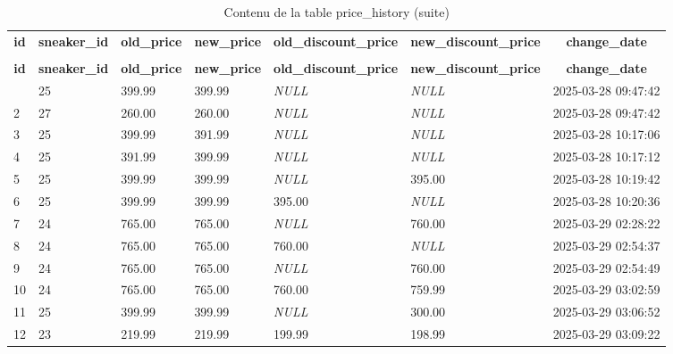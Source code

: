 %
%
 \begin{longtable}{|l|l|l|l|l|l|l|} 
 \hline \endhead \hline \endfoot \hline 
 \caption{Contenu de la table price\_history} \label{tab:price_history-data} \\\hline \multicolumn{1}{|c|}{\textbf{id}} & \multicolumn{1}{|c|}{\textbf{sneaker\_id}} & \multicolumn{1}{|c|}{\textbf{old\_price}} & \multicolumn{1}{|c|}{\textbf{new\_price}} & \multicolumn{1}{|c|}{\textbf{old\_discount\_price}} & \multicolumn{1}{|c|}{\textbf{new\_discount\_price}} & \multicolumn{1}{|c|}{\textbf{change\_date}} \\ \hline \hline  \endfirsthead 
\caption{Contenu de la table price\_history (suite)} \\ \hline \multicolumn{1}{|c|}{\textbf{id}} & \multicolumn{1}{|c|}{\textbf{sneaker\_id}} & \multicolumn{1}{|c|}{\textbf{old\_price}} & \multicolumn{1}{|c|}{\textbf{new\_price}} & \multicolumn{1}{|c|}{\textbf{old\_discount\_price}} & \multicolumn{1}{|c|}{\textbf{new\_discount\_price}} & \multicolumn{1}{|c|}{\textbf{change\_date}} \\ \hline \hline \endhead \endfoot
1 & 25 & 399.99 & 399.99 & \textit{NULL} & \textit{NULL} & 2025-03-28 09:47:42 \\ \hline 
2 & 27 & 260.00 & 260.00 & \textit{NULL} & \textit{NULL} & 2025-03-28 09:47:42 \\ \hline 
3 & 25 & 399.99 & 391.99 & \textit{NULL} & \textit{NULL} & 2025-03-28 10:17:06 \\ \hline 
4 & 25 & 391.99 & 399.99 & \textit{NULL} & \textit{NULL} & 2025-03-28 10:17:12 \\ \hline 
5 & 25 & 399.99 & 399.99 & \textit{NULL} & 395.00 & 2025-03-28 10:19:42 \\ \hline 
6 & 25 & 399.99 & 399.99 & 395.00 & \textit{NULL} & 2025-03-28 10:20:36 \\ \hline 
7 & 24 & 765.00 & 765.00 & \textit{NULL} & 760.00 & 2025-03-29 02:28:22 \\ \hline 
8 & 24 & 765.00 & 765.00 & 760.00 & \textit{NULL} & 2025-03-29 02:54:37 \\ \hline 
9 & 24 & 765.00 & 765.00 & \textit{NULL} & 760.00 & 2025-03-29 02:54:49 \\ \hline 
10 & 24 & 765.00 & 765.00 & 760.00 & 759.99 & 2025-03-29 03:02:59 \\ \hline 
11 & 25 & 399.99 & 399.99 & \textit{NULL} & 300.00 & 2025-03-29 03:06:52 \\ \hline 
12 & 23 & 219.99 & 219.99 & 199.99 & 198.99 & 2025-03-29 03:09:22 \\ \hline 

\end{longtable}
